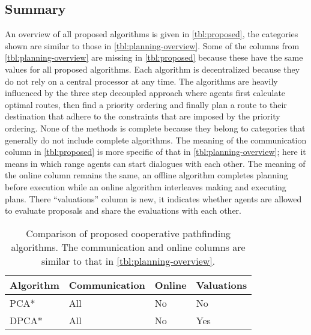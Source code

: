 \subsection{Summary}
An overview of all proposed algorithms is given in \autoref{tbl:proposed}, the
categories shown are similar to those in \autoref{tbl:planning-overview}. Some
of the columns from \autoref{tbl:planning-overview} are missing in
\autoref{tbl:proposed} because these have the same values for all proposed
algorithms. Each algorithm is decentralized because they do not rely on a
central processor at any time. The algorithms are heavily influenced by the
three step decoupled approach where agents first calculate optimal routes, then
find a priority ordering and finally plan a route to their destination that
adhere to the constraints that are imposed by the priority ordering. None of
the methods is complete because they belong to categories that generally do not
include complete algorithms. The meaning of the communication column in
\autoref{tbl:proposed} is more specific of that in
\autoref{tbl:planning-overview}; here it means in which range agents can start
dialogues with each other. The meaning of the online column remains the same,
an offline algorithm completes planning before execution while an online
algorithm interleaves making and executing plans. There ``valuations'' column
is new, it indicates whether agents are allowed to evaluate proposals and share
the evaluations with each other.

\begin{table}
    \centering
    \caption{Comparison of proposed cooperative pathfinding algorithms. The
    communication and online columns are similar to that in
    \autoref{tbl:planning-overview}.}
    \label{tbl:proposed}
    \begin{tabular}{l|l|l|l}
        Algorithm & Communication & Online & Valuations \\ \hline
        PCA*   & All & No & No \\
        DPCA*  & All & No & Yes \\
    \end{tabular}
\end{table}

